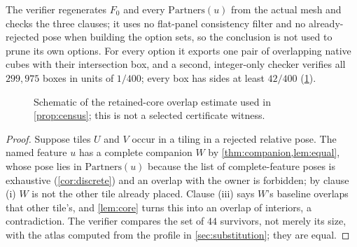 
The verifier regenerates $F_0$ and every $\mathrm{Partners}(u)$ from the actual mesh and checks
the three clauses; it uses no flat-panel consistency filter and no already-rejected pose when
building the option sets, so the conclusion is not used to prune its own options. For every
option it exports one pair of overlapping native cubes with their intersection box, and a
second, integer-only checker verifies all $299{,}975$ boxes in units of $1/400$; every box has
sides at least $42/400$ (\cref{fig:collision}).

\begin{figure}[ht]
  \centering
  \resizebox{0.9\linewidth}{!}{}
  \caption{Schematic of the retained-core overlap estimate used in \cref{prop:census}; this is
  not a selected certificate witness.}
  \label{fig:collision}
\end{figure}


\begin{proof}
Suppose tiles $U$ and $V$ occur in a tiling in a rejected relative pose. The named feature $u$ has
a complete companion $W$ by \cref{thm:companion,lem:equal}, whose pose lies in
$\mathrm{Partners}(u)$ because the list of complete-feature poses is exhaustive
(\cref{cor:discrete}) and an overlap with the owner is forbidden; by clause (i) $W$ is not the
other tile already placed. Clause (iii) says $W$'s baseline overlaps that other tile's, and
\cref{lem:core} turns this into an overlap of interiors, a contradiction. The verifier compares
the set of $44$ survivors, not merely its size, with the atlas computed from the profile in
\cref{sec:substitution}; they are equal.
\end{proof}

